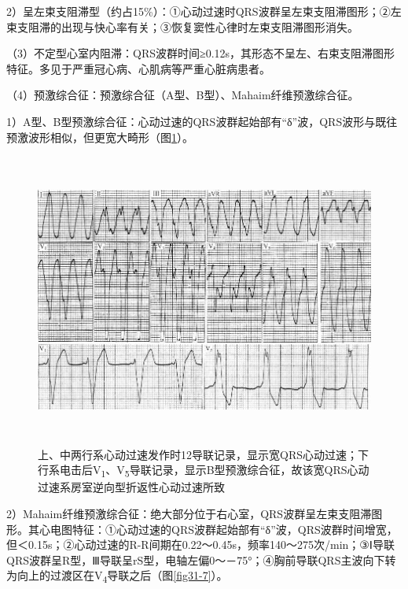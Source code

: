 2）呈左束支阻滞型（约占15\%）：①心动过速时QRS波群呈左束支阻滞图形；②左束支阻滞的出现与快心率有关；③恢复窦性心律时左束支阻滞图形消失。

（3）不定型心室内阻滞：QRS波群时间≥0.12s，其形态不呈左、右束支阻滞图形特征。多见于严重冠心病、心肌病等严重心脏病患者。

（4）预激综合征：预激综合征（A型、B型）、Mahaim纤维预激综合征。

1）A型、B型预激综合征：心动过速的QRS波群起始部有“δ”波，QRS波形与既往预激波形相似，但更宽大畸形（图\ref{fig31-6}）。

\begin{figure}[!htbp]
 \centering
 \includegraphics[width=5.79167in,height=3.80208in]{./images/Image00509.jpg}
 \captionsetup{justification=centering}
 \caption{上、中两行系心动过速发作时12导联记录，显示宽QRS心动过速；下行系电击后V\textsubscript{1}、V\textsubscript{5}导联记录，显示B型预激综合征，故该宽QRS心动过速系房室逆向型折返性心动过速所致}
 \label{fig31-6}
  \end{figure} 


2）Mahaim纤维预激综合征：绝大部分位于右心室，QRS波群呈左束支阻滞图形。其心电图特征：①心动过速的QRS波群起始部有“δ”波，QRS波群时间增宽，但＜0.15s；②心动过速的R-R间期在0.22～0.45s，频率140～275次/min；③Ⅰ导联QRS波群呈R型，Ⅲ导联呈rS型，电轴左偏0～－75°；④胸前导联QRS主波向下转为向上的过渡区在V\textsubscript{4}导联之后（图\ref{fig31-7}）。

